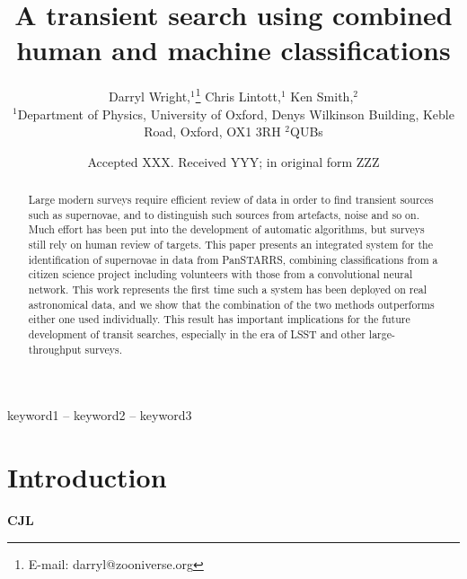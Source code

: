 \documentclass[a4paper,fleqn,usenatbib]{mnras}
\title[Human and machine classifications]{A transient search using combined human and machine classifications}
\author[D. Wright, C. Lintott, K. Smith et al.]{
Darryl Wright,$^{1}$\thanks{E-mail: darryl@zooniverse.org}
Chris Lintott,$^{1}$
Ken Smith,$^{2}$
\\
$^{1}$Department of Physics, University of Oxford, Denys Wilkinson Building, Keble Road, Oxford, OX1 3RH
$^{2}$QUBs
}
\date{Accepted XXX. Received YYY; in original form ZZZ}
\begin{document}
\label{firstpage}
\pagerange{\pageref{firstpage}--\pageref{lastpage}}
\maketitle

\begin{abstract}
Large modern surveys require efficient review of data in order to find transient sources such as supernovae, and to distinguish such sources from artefacts, noise and so on. Much effort has been put into the development of automatic algorithms, but surveys still rely on human review of targets. This paper presents an integrated system for the identification of supernovae in data from PanSTARRS, combining classifications from a citizen science project including volunteers with those from a convolutional neural network. This work represents the first time such a system has been deployed on real astronomical data, and we show that the combination of the two methods outperforms either one used individually. This result has important implications for the future development of transit searches, especially in the era of LSST and other large-throughput surveys. 
\end{abstract}

\begin{keywords}
keyword1 -- keyword2 -- keyword3
\end{keywords}



\section{Introduction}

\textbf{CJL}
\end{document}
